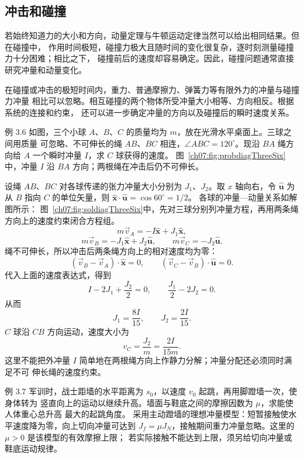 \subsection{冲击和碰撞}

若始终知道力的大小和方向，动量定理与牛顿运动定律当然可以给出相同结果。但在碰撞中，
作用时间极短，碰撞力极大且随时间的变化很复杂，逐时刻测量碰撞力十分困难；相比之下，
碰撞前后的速度却容易确定。因此，碰撞问题通常直接研究冲量和动量变化。

在碰撞或冲击的极短时间内，重力、普通摩擦力、弹簧力等有限外力的冲量与碰撞力冲量
相比可以忽略。相互碰撞的两个物体所受冲量大小相等、方向相反。根据系统的连接和约束，
还可以进一步确定冲量的方向以及碰撞后的瞬时速度关系。

\Needspace{0.31\textheight}
\begin{origexamplebox}{例 3.6}
如图，三个小球 $A$、$B$、$C$ 的质量均为 $m$，放在光滑水平桌面上。三球之间用质量
可忽略、不可伸长的绳 $AB$、$BC$ 相连，$\angle ABC=120^\circ$。现沿 $BA$ 绳方向给
$A$ 一个瞬时冲量 $I$，求 $C$ 球获得的速度。
图~\ref{ch07:fig:probdiagThreeSix}中，冲量 $I$ 沿 $BA$ 方向；两根绳在冲击后仍不可伸长。
\probdiagThreeSix
\end{origexamplebox}

\begin{xesolution}
设绳 $AB$、$BC$ 对各球传递的张力冲量大小分别为 $J_1$、$J_2$。取 $x$ 轴向右，令
$\hat{\boldsymbol u}$ 为从 $B$ 指向 $C$ 的单位矢量，则
$\hat{\boldsymbol x}\mathbin{\cdot}\hat{\boldsymbol u}=\cos60^\circ=1/2$。
各球的冲量—动量关系如解图所示：
图~\ref{ch07:fig:soldiagThreeSix}中，先对三球分别列冲量方程，再用两条绳方向上的速度约束闭合方程组。
\soldiagThreeSix
\[
 m\vec v_A=-I\hat{\boldsymbol x}+J_1\hat{\boldsymbol x},
\]
\[
 m\vec v_B=-J_1\hat{\boldsymbol x}+J_2\hat{\boldsymbol u},
 \qquad
 m\vec v_C=-J_2\hat{\boldsymbol u}.
\]
绳不可伸长，所以冲击后两条绳方向上的相对速度均为零：
\[
 (\vec v_B-\vec v_A)\mathbin{\cdot}\hat{\boldsymbol x}=0,
 \qquad
 (\vec v_C-\vec v_B)\mathbin{\cdot}\hat{\boldsymbol u}=0.
\]
代入上面的速度表达式，得到
\[
 I-2J_1+\frac{J_2}{2}=0,
 \qquad
 \frac{J_1}{2}-2J_2=0.
\]
从而
\[
 J_1=\frac{8I}{15},
 \qquad
 J_2=\frac{2I}{15}.
\]
$C$ 球沿 $CB$ 方向运动，速度大小为
\[
 \boxed{v_C=\frac{J_2}{m}=\frac{2I}{15m}}.
\]
这里不能把外冲量 $I$ 简单地在两根绳方向上作静力分解；冲量分配还必须同时满足不可
伸长绳的速度约束。
\end{xesolution}

\begin{origexamplebox}{例 3.7}
军训时，战士距墙的水平距离为 $s_0$，以速度 $v_0$ 起跳，再用脚蹬墙一次，使身体转为
竖直向上的运动以继续升高。墙面与鞋底之间的摩擦因数为 $\mu$，求能使人体重心总升高
最大的起跳角度。
采用主动蹬墙的理想冲量模型：短暂接触使水平速度降为零，向上切向冲量可达到
$J_f=\mu J_N$，接触期间重力冲量忽略。这里的 $\mu>0$ 是该模型的有效摩擦上限；
若实际接触不能达到上限，须另给切向冲量或鞋底运动规律。
\end{origexamplebox}

